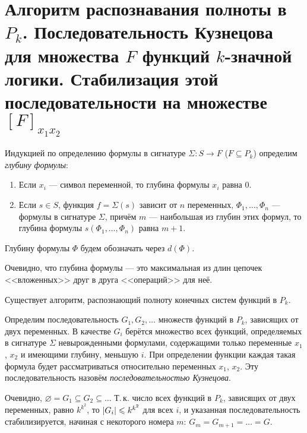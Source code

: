 \section{Алгоритм распознавания полноты в $P_k$. Последовательность Кузнецова для множества $F$ функций $k$-значной логики. Стабилизация этой последовательности на множестве $[F]_{x_1x_2}$}

\begin{definition}
    Индукцией по определению формулы в сигнатуре $\Sigma: S \to F$ ($F \subseteq P_k$) определим \textit{глубину формулы}:
    \begin{enumerate}
        \item Если $x_i$ --- символ переменной, то глубина формулы $x_i$ равна $0$.
        \item Если $s \in S$, функция $f = \Sigma(s)$ зависит от $n$ переменных, $\Phi_1, \ldots, \Phi_n$ --- формулы в сигнатуре $\Sigma$, причём $m$ --- наибольшая из глубин этих формул, то глубина формулы $s(\Phi_1, \ldots, \Phi_n)$ равна $m + 1$.
    \end{enumerate}
    Глубину формулы $\Phi$ будем обозначать через $d(\Phi)$.
\end{definition}

\begin{remark}
    Очевидно, что глубина формулы --- это максимальная из длин цепочек <<вложенных>> друг в друга <<операций>> для неё.
\end{remark}

\begin{theorem}
    Существует алгоритм, распознающий полноту конечных систем функций в $P_k$.
\end{theorem}

\begin{definition}
    Определим последовательность $G_1, G_2, \ldots$ множеств функций в $P_k$, зависящих от двух переменных. В качестве $G_i$ берётся множество всех функций, определяемых в сигнатуре $\Sigma$ невырожденными формулами, содержащими только переменные $x_1$, $x_2$ и имеющими глубину, меньшую $i$. При определении функции каждая такая формула будет рассматриваться относительно переменных $x_1$, $x_2$. Эту последовательность назовём \textit{последовательностью Кузнецова}.
\end{definition}

Очевидно, $\varnothing = G_1 \subseteq G_2 \subseteq \ldots$ Т.\,к. число всех функций в $P_k$, зависящих от двух переменных, равно $k^{k^2}$, то $\left\lvert G_i\right\rvert \leqslant k^{k^2}$ для всех $i$, и указанная последовательность стабилизируется, начиная с некоторого номера $m$: $G_m = G_{m + 1} = \ldots = G$.

